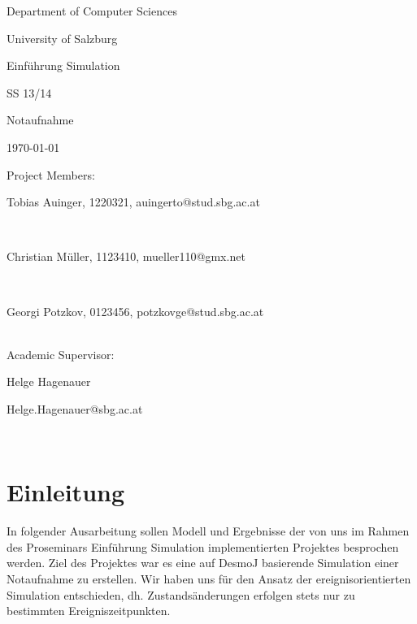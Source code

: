 \documentclass[12pt,fleqn,a4paper]{article}
\begin{document}
\begin{titlepage}%
\vspace{2cm}
\centerline{
\large{Department of Computer Sciences}}
\vspace{0.2cm}
\centerline{\large{University of Salzburg}}%
\vspace{2cm}

\centerline{\large{Einf\"{u}hrung Simulation}}
\centerline{SS 13/14}
\vspace{1cm}

\centerline{\huge{Notaufnahme}}
\vspace{1cm}

\vspace{0.4cm}%
\centerline{\today}
\vspace{5cm}%

\vspace{0.2cm}
Project Members:\\
\centerline{Tobias Auinger, 1220321, auingerto@stud.sbg.ac.at}\\
\centerline{Christian M\"{u}ller, 1123410, mueller110@gmx.net}\\
\centerline{Georgi Potzkov, 0123456, potzkovge@stud.sbg.ac.at}
\vspace {0.8cm}\\

Academic Supervisor: \\
\centerline{Helge Hagenauer}
\centerline{Helge.Hagenauer@sbg.ac.at}
\vspace{0.8cm}\\
\clearpage
\end{titlepage}


\clearpage
\pagestyle{headings}
\setcounter{page}{1}
\setcounter{page}{1}

\tableofcontents
\newpage

\section{Einleitung}
In folgender Ausarbeitung sollen  Modell und Ergebnisse der von uns im Rahmen des Proseminars Einf\"{u}hrung Simulation implementierten Projektes besprochen werden.
Ziel des Projektes war es eine auf DesmoJ basierende Simulation einer Notaufnahme zu erstellen. Wir haben uns f\"{u}r den Ansatz der ereignisorientierten Simulation entschieden, dh. Zustands\"{a}nderungen erfolgen stets nur zu bestimmten Ereigniszeitpunkten.
\end{document}
